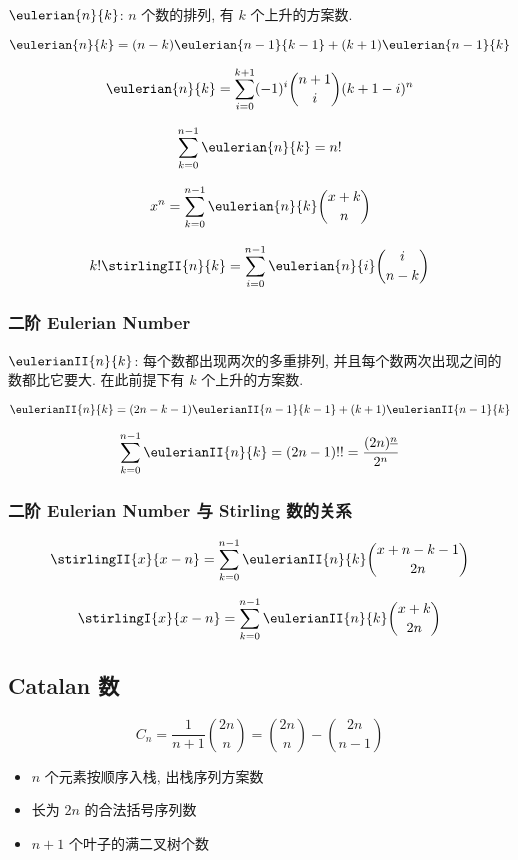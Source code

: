 \(\eulerian{n}{k}\): \(n\) 个数的排列, 有 \(k\) 个上升的方案数.

\[
    \eulerian{n}{k} = (n - k)\eulerian{n - 1}{k - 1} + (k + 1)\eulerian{n - 1}{k}
\]

\[
    \eulerian{n}{k} = \sum_{i = 0} ^ {k + 1} (-1)^i \binom{n + 1}{i} (k + 1 - i)^n
\]

\[
    \sum_{k = 0} ^ {n - 1} \eulerian{n}{k} = n!
\]

\[
    x^n = \sum_{k = 0} ^ {n - 1} \eulerian{n}{k} \binom{x+k}{n} 
\]

\[
    k!\stirlingII{n}{k} = \sum_{i = 0} ^ {n - 1} \eulerian{n}{i} \binom{i}{n - k}
\]

\subsubsection{二阶 Eulerian Number}
\label{ssec:二阶-eulerian-number}

\(\eulerianII{n}{k}\): 每个数都出现两次的多重排列, 并且每个数两次出现之间的数都比它要大. 在此前提下有 \(k\) 个上升的方案数.

\[
    \eulerianII{n}{k} = (2n-k-1)\eulerianII{n-1}{k-1} + (k+1)\eulerianII{n-1}{k}
\]

\[
    \sum_{k = 0} ^ {n - 1} \eulerianII{n}{k} = (2n-1)!! = \frac{(2n)^{\underline n}} {2^n}
\]

\subsubsection{二阶 Eulerian Number 与 Stirling 数的关系}
\label{ssec:二阶-eulerian-number-与-Stirling-数的关系}

\[
    \stirlingII{x}{x-n} = \sum_{k = 0} ^ {n - 1} \eulerianII{n}{k} \binom{x + n - k - 1}{2n}
\]

\[
    \stirlingI{x}{x-n} = \sum_{k = 0} ^ {n - 1} \eulerianII{n}{k} \binom{x + k}{2n}
\]

\subsection{Catalan 数}
\label{sec:catalan-数}

\[
    C_n = \frac{1}{n + 1}\binom{2n}{n} = \binom{2n}{n} - \binom{2n}{n - 1}
\]

\begin{itemize}
    \item \(n\) 个元素按顺序入栈, 出栈序列方案数
    \item 长为 \(2n\) 的合法括号序列数
    \item \(n + 1\) 个叶子的满二叉树个数
\end{itemize}

